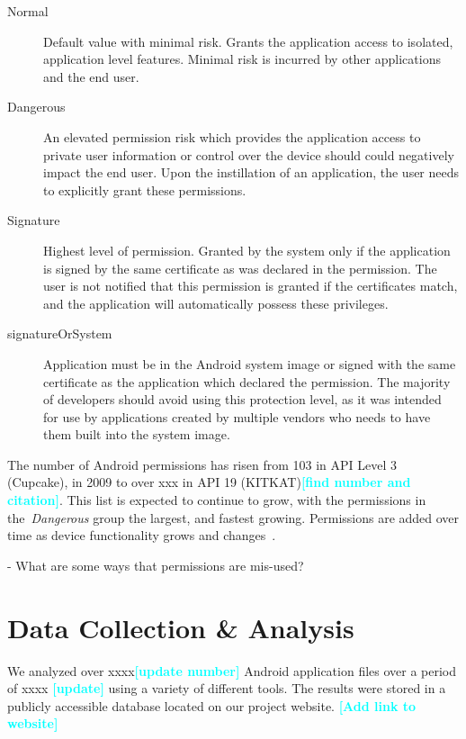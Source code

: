 \documentclass{sig-alternate}
\newcommand{\todo}[1]{\textcolor{cyan}{\textbf{[#1]}}}
\begin{document}
\begin{description}
  \item[Normal] Default value with minimal risk. Grants the application access to isolated, application level features. Minimal risk is incurred by other applications and the end user.
  \item[Dangerous] An elevated permission risk which provides the application access to private user information or control over the device should could negatively impact the end user. Upon the instillation of an application, the user needs to explicitly grant these permissions.
\item[Signature] Highest level of permission. Granted by the system only if the application is signed by the same certificate as was declared in the permission. The user is not notified that this permission is granted if the certificates match, and the application will automatically possess these privileges.
  \item[signatureOrSystem] Application must be in the Android system image or signed with the same certificate as the application which declared the permission. The majority of developers should avoid using this protection level, as it was intended for use by applications created by multiple vendors who needs to have them built into the system image.

\end{description}


The number of Android permissions has risen from 103 in API Level 3 (Cupcake), in 2009 to over xxx in API 19 (KITKAT)\todo{find number and citation}. This list is expected to continue to grow, with the permissions in the~\emph{Dangerous} group the largest, and fastest growing. Permissions are added over time as device functionality grows and changes~\cite{Wei:2012:PEA:2420950.2420956}.


- What are some ways that permissions are mis-used?






\label{sec: dca}
\section{Data Collection \& Analysis}

We analyzed over xxxx\todo{update number} Android application files over a period of xxxx \todo{update} using a variety of different tools. The results were stored in a publicly accessible database located on our project website. \todo{Add link to website}
\end{document}
